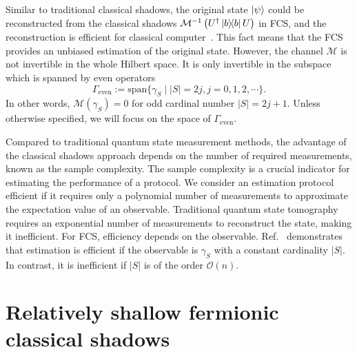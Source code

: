 \documentclass{article}
\begin{document}
Similar to traditional classical shadows, the original state $\ket{\psi}$ could be reconstructed from the classical shadows $\mathcal{M}^{-1}\left(U^{\dagger} \ketbra{b}{b} U\right)$ in FCS, and the reconstruction is efficient for classical computer~\cite{wan2022matchgate}. This fact means that the FCS provides an unbiased estimation of the original state.
However, the channel $\mathcal{M}$ is not invertible in the whole Hilbert space. It is only invertible in the subspace which is spanned by even operators
\begin{equation}
    \Gamma_{\text{even}} := \mathrm{span}\{ \gamma_S \mid |S| = 2j, j=0,1,2,\cdots \}.
\end{equation}
In other words, $\mathcal{M}(\gamma_S) = 0$ for odd cardinal number $|S| = 2j+1$. Unless otherwise specified, we will focus on the space of $\Gamma_{\text{even}}$. 

Compared to traditional quantum state measurement methods, the advantage of the classical shadows approach depends on the number of required measurements, known as the sample complexity. The sample complexity is a crucial indicator for estimating the performance of a protocol. We consider an estimation protocol efficient if it requires only a polynomial number of measurements to approximate the expectation value of an observable. 
Traditional quantum state tomography requires an exponential number of measurements to reconstruct the state, making it inefficient. For FCS, efficiency depends on the observable. Ref.~\cite{wan2022matchgate} demonstrates that estimation is efficient if the observable is $\gamma_S$ with a constant cardinality $|S|$. In contrast, it is inefficient if $|S|$ is of the order $\mathcal{O}(n)$.

\section{Relatively shallow fermionic classical shadows}



\end{document}
